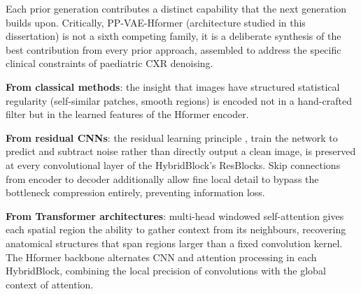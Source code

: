 \documentclass[12pt, a4paper, twoside, openright]{book}
\begin{document}
Each prior generation contributes a distinct capability that the next generation builds upon. Critically, PP-VAE-Hformer (architecture studied in this dissertation) is not a sixth competing family, it is a deliberate synthesis of the best contribution from every prior approach, assembled to address the specific clinical constraints of paediatric CXR denoising.

\textbf{From classical methods}: the insight that images have structured statistical regularity (self-similar patches, smooth regions) is encoded not in a hand-crafted filter but in the learned features of the Hformer encoder.

\textbf{From residual CNNs}: the residual learning principle \cite{he_deep_2016}, train the network to predict and subtract noise rather than directly output a clean image, is preserved at every convolutional layer of the HybridBlock's ResBlocks. Skip connections from encoder to decoder additionally allow fine local detail to bypass the bottleneck compression entirely, preventing information loss.

\textbf{From Transformer architectures}: multi-head windowed self-attention \cite{liu_swin_2021} gives each spatial region the ability to gather context from its neighbours, recovering anatomical structures that span regions larger than a fixed convolution kernel. The Hformer backbone \cite{zhang_hformer_2023} alternates CNN and attention processing in each HybridBlock, combining the local precision of convolutions with the global context of attention.
\end{document}
